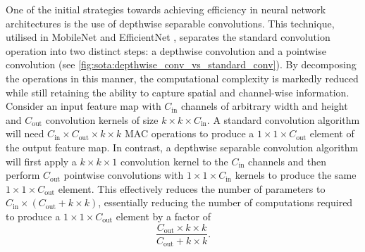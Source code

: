 One of the initial strategies towards achieving efficiency in neural network
architectures is the use of depthwise separable convolutions. This technique,
utilised in MobileNet \cite{howard2017mobilenets} and EfficientNet
\cite{DBLP:conf/icml/TanL19}, separates the standard convolution operation into
two distinct steps: a depthwise convolution and a pointwise convolution (see
\cref{fig:sota:depthwise_conv_vs_standard_conv}). By decomposing the operations
in this manner, the computational complexity is markedly reduced while still
retaining the ability to capture spatial and channel-wise information. Consider
an input feature map with $C_\text{in}$ channels of arbitrary width and height
and $C_\text{out}$ convolution kernels of size $k\times k \times C_\text{in}$. A
standard convolution algorithm will need $C_\text{in} \times C_\text{out} \times
k \times k$ \ac{MAC} operations to produce a $1 \times 1 \times C_\text{out}$
element of the output feature map. In contrast, a depthwise separable
convolution algorithm will first apply a $k\times k \times 1$ convolution kernel
to the $C_\text{in}$ channels and then perform $C_\text{out}$ pointwise
convolutions with $1\times 1 \times C_\text{in}$ kernels to produce the same
$1\times 1 \times C_\text{out}$ element. This effectively reduces the number of
parameters to $C_\text{in} \times (C_\text{out} + k \times k)$, essentially
reducing the number of computations required to produce a $1 \times 1 \times
C_\text{out}$ element by a factor of\\

$$\displaystyle\frac{C_\text{out}\times k \times k}{C_\text{out} + k \times k}.$$\\


